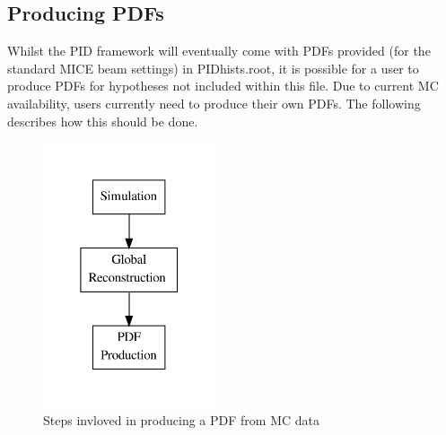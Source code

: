 \subsection{Producing PDFs}
\label{pid_PDFs}
Whilst the PID framework will eventually come with PDFs provided (for the standard MICE beam settings) in  PIDhists.root, it is possible for a user to produce PDFs for hypotheses not included within this file. Due to current MC availability, users currently need to produce their own PDFs. The following describes how this should be done.
\begin{figure}[h!]
\begin{center} 
\includegraphics[width=2in]{reconstruction/globalpid/pdfprodflow.pdf} 
\caption{Steps invloved in producing a PDF from MC data}
\label{pdfprod}
\end{center} 
\end{figure}
